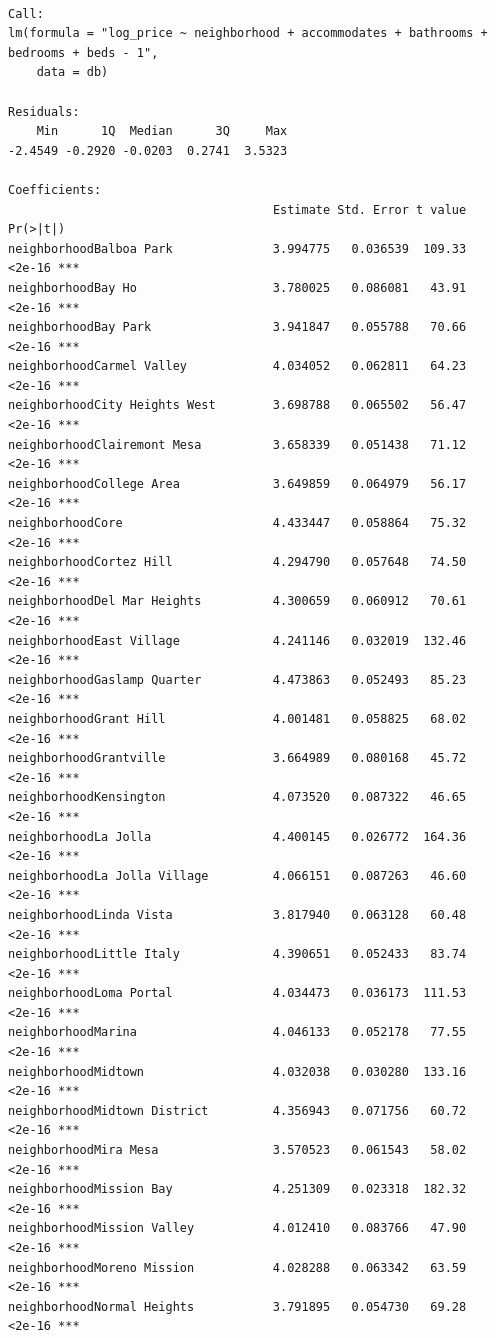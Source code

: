 \documentclass[
  letterpaper,
  DIV=11,
  numbers=noendperiod,
  oneside]{scrreprt}
\begin{document}
\begin{verbatim}

Call:
lm(formula = "log_price ~ neighborhood + accommodates + bathrooms + bedrooms + beds - 1", 
    data = db)

Residuals:
    Min      1Q  Median      3Q     Max 
-2.4549 -0.2920 -0.0203  0.2741  3.5323 

Coefficients:
                                     Estimate Std. Error t value Pr(>|t|)    
neighborhoodBalboa Park              3.994775   0.036539  109.33   <2e-16 ***
neighborhoodBay Ho                   3.780025   0.086081   43.91   <2e-16 ***
neighborhoodBay Park                 3.941847   0.055788   70.66   <2e-16 ***
neighborhoodCarmel Valley            4.034052   0.062811   64.23   <2e-16 ***
neighborhoodCity Heights West        3.698788   0.065502   56.47   <2e-16 ***
neighborhoodClairemont Mesa          3.658339   0.051438   71.12   <2e-16 ***
neighborhoodCollege Area             3.649859   0.064979   56.17   <2e-16 ***
neighborhoodCore                     4.433447   0.058864   75.32   <2e-16 ***
neighborhoodCortez Hill              4.294790   0.057648   74.50   <2e-16 ***
neighborhoodDel Mar Heights          4.300659   0.060912   70.61   <2e-16 ***
neighborhoodEast Village             4.241146   0.032019  132.46   <2e-16 ***
neighborhoodGaslamp Quarter          4.473863   0.052493   85.23   <2e-16 ***
neighborhoodGrant Hill               4.001481   0.058825   68.02   <2e-16 ***
neighborhoodGrantville               3.664989   0.080168   45.72   <2e-16 ***
neighborhoodKensington               4.073520   0.087322   46.65   <2e-16 ***
neighborhoodLa Jolla                 4.400145   0.026772  164.36   <2e-16 ***
neighborhoodLa Jolla Village         4.066151   0.087263   46.60   <2e-16 ***
neighborhoodLinda Vista              3.817940   0.063128   60.48   <2e-16 ***
neighborhoodLittle Italy             4.390651   0.052433   83.74   <2e-16 ***
neighborhoodLoma Portal              4.034473   0.036173  111.53   <2e-16 ***
neighborhoodMarina                   4.046133   0.052178   77.55   <2e-16 ***
neighborhoodMidtown                  4.032038   0.030280  133.16   <2e-16 ***
neighborhoodMidtown District         4.356943   0.071756   60.72   <2e-16 ***
neighborhoodMira Mesa                3.570523   0.061543   58.02   <2e-16 ***
neighborhoodMission Bay              4.251309   0.023318  182.32   <2e-16 ***
neighborhoodMission Valley           4.012410   0.083766   47.90   <2e-16 ***
neighborhoodMoreno Mission           4.028288   0.063342   63.59   <2e-16 ***
neighborhoodNormal Heights           3.791895   0.054730   69.28   <2e-16 ***

\end{verbatim}
\end{document}
